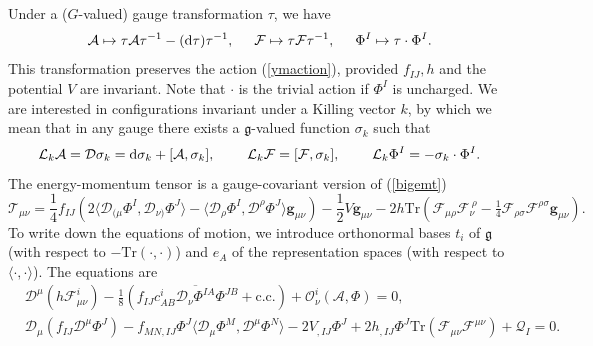 \documentclass[11pt, reqno]{amsart}
\theoremstyle{plain}
\theoremstyle{definition}
\numberwithin{equation}{section}
\begin{document}
Under a ($G$-valued) gauge transformation $\tau$, we have 
\begin{equation*}
    \mathcal{A} \mapsto \tau \mathcal{A}\tau^{-1} - (\text{d}\tau )\tau^{-1}, \hspace{.5cm} \mathcal{F} \mapsto \tau \mathcal{F}\tau^{-1}, \hspace{.5cm} \Phi^I \mapsto \tau \cdot \Phi^I.
\end{equation*}
This transformation preserves the action (\ref{ymaction}), provided $f_{IJ}, h$ and the potential $V$ are invariant. Note that $\cdot$ is the trivial action if $\Phi^I$ is uncharged. We are interested in configurations invariant under a Killing vector $k$, by which we mean that in any gauge there exists a $\mathfrak{g}$-valued function $\sigma_k$ such that 
\begin{equation} \label{kinv}
    \mathcal{L}_k \mathcal{A} = \mathcal{D}\sigma_k = \text{d}\sigma_k + [\mathcal{A},\sigma_k], \hspace{.8cm} \mathcal{L}_k\mathcal{F} = [\mathcal{F},\sigma_k], \hspace{.8cm} \mathcal{L}_k \Phi^I = -\sigma_k \cdot \Phi^I.
\end{equation}
The energy-momentum tensor is a gauge-covariant version of (\ref{bigemt})
\begin{equation} \label{bigemt2}
    \mathcal{T}_{\mu\nu} = \frac 14 f_{IJ}\left(2\langle \mathcal{D}_{(\mu}\Phi^I,\mathcal{D}_{\nu)}\Phi^J\rangle - \langle\mathcal{D}_\rho\Phi^I,\mathcal{D}^\rho\Phi^J\rangle \textbf{g}_{\mu\nu}\right) - \frac 12V\textbf{g}_{\mu\nu} - 2h\text{Tr}\left(\mathcal{F}_{\mu\rho}\mathcal{F}_\nu^{\:\rho} - \tfrac 14\mathcal{F}_{\rho\sigma}\mathcal{F}^{\rho\sigma}\textbf{g}_{\mu\nu}\right).
\end{equation}
To write down the equations of motion, we introduce orthonormal bases $t_i$ of $\mathfrak{g}$ (with respect to $-\text{Tr}(\cdot,\cdot)$) and $e_A$ of the representation spaces (with respect to $\langle \cdot ,\cdot\rangle$). The equations are
\begin{subequations}\label{DFeom}
\begin{align} 
    &\mathcal{D}^\mu(h\mathcal{F}_{\mu\nu}^i) - \tfrac 18\left(f_{IJ}c^i_{AB}\overline{\mathcal{D}_\nu \Phi^{IA}}\Phi^{JB} + \text{c.c.}\right) + \mathcal{O}^i_\nu(\mathcal{A},\Phi) = 0, \label{nafeom}\\
    &\mathcal{D}_\mu(f_{IJ}\mathcal{D}^\mu\Phi^J) -  f_{MN,IJ}\Phi^J\langle \mathcal{D}_\mu \Phi^M, \mathcal{D}^\mu\Phi^N\rangle - 2V_{,IJ}\Phi^J + 2h_{,IJ}\Phi^J\text{Tr}\left(\mathcal{F}_{\mu\nu}\mathcal{F}^{\mu\nu}\right) + \mathcal{Q}_I = 0. \label{phiceomb}
\end{align}
\end{subequations}
\end{document}
